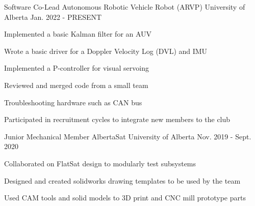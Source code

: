 

\begin{cventries}

  \cventry
    {Software Co-Lead} %
    {Autonomous Robotic Vehicle Robot (ARVP)} %
    {University of Alberta} %
    {Jan. 2022 - PRESENT} %
    {
      \begin{cvitems} %
        \item Implemented a basic Kalman filter for an AUV
        \item Wrote a basic driver for a Doppler Velocity Log (DVL) and IMU
        \item Implemented a P-controller for visual servoing
        \item Reviewed and merged code from a small team
        \item Troubleshooting hardware such as CAN bus
        \item Participated in recruitment cycles to integrate new members to the club 
      \end{cvitems}
    }

  \cventry
    {Junior Mechanical Member} %
    {AlbertaSat} %
    {University of Alberta} %
    {Nov. 2019 - Sept. 2020} %
    {
      \begin{cvitems} %
        \item Collaborated on FlatSat design to modularly test subsystems
        \item Designed and created solidworks drawing templates to be used by the team
        \item Used CAM tools and solid models to 3D print and CNC mill prototype parts
      \end{cvitems}
    }

\end{cventries}
